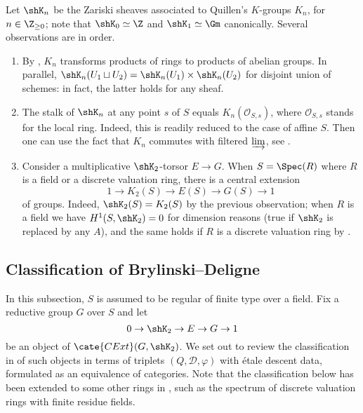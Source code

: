 \documentclass[a4paper,10pt]{article}
\begin{document}
Let $\shK_n$ be the Zariski sheaves associated to Quillen's $K$-groups $K_n$, for $n \in \Z_{\geq 0}$; note that $\shK_0 \simeq \Z$ and $\shK_1 \simeq \Gm$ canonically. Several observations are in order.
\begin{enumerate}
	\item By \cite[IV.6.4]{Wei13}, $K_n$ transforms products of rings to products of abelian groups. In parallel, $\shK_n(U_1 \sqcup U_2) = \shK_n(U_1) \times \shK_n(U_2)$ for disjoint union of schemes: in fact, the latter holds for any sheaf.
	\item The stalk of $\shK_n$ at any point $s$ of $S$ equals $K_n(\mathcal{O}_{S,s})$, where $\mathcal{O}_{S,s}$ stands for the local ring. Indeed, this is readily reduced to the case of affine $S$. Then one can use the fact that $K_n$ commutes with filtered $\varinjlim$, see \cite[IV. 6.4]{Wei13}.
	\item Consider a multiplicative $\shK_2$-torsor $E \to G$. When $S = \Spec(R)$ where $R$ is a field or a discrete valuation ring, there is a central extension
		\[ 1 \to K_2(S) \to E(S) \to G(S) \to 1 \]
		of groups. Indeed, $\shK_2(S) = K_2(S)$ by the previous observation; when $R$ is a field we have $H^1(S, \shK_2)=0$ for dimension reasons (true if $\shK_2$ is replaced by any $A$), and the same holds if $R$ is a discrete valuation ring by \cite[Corollary 3.5]{Weis16}.
\end{enumerate}

\subsection{Classification of Brylinski--Deligne}\label{sec:BD-classification}
In this subsection, $S$ is assumed to be regular of finite type over a field. Fix a reductive group $G$ over $S$ and let
\[ 0 \to \shK_2 \to E \to G \to 1 \]
be an object of $\cate{CExt}(G,\shK_2)$. We set out to review the classification in \cite{BD01} of such objects in terms of triplets $(Q,\mathcal{D},\varphi)$ with étale descent data, formulated as an equivalence of categories. Note that the classification below has been extended to some other rings in \cite{Weis16}, such as the spectrum of discrete valuation rings with finite residue fields.
\end{document}
